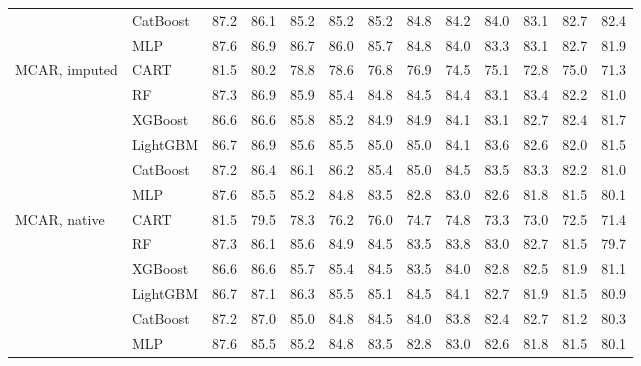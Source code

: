 \documentclass[pdflatex,sn-mathphys]{sn-jnl}
\theoremstyle{thmstyleone}
\begin{document}
\begin{table}[htbp]
\begin{tabular}{@{}llrrrrrrrrrrr@{}}
 & CatBoost & 87.2 & 86.1 & 85.2 & 85.2 & 85.2 & 84.8 & 84.2 & 84.0 & 83.1 & 82.7 & 82.4 \\
 & MLP & 87.6 & 86.9 & 86.7 & 86.0 & 85.7 & 84.8 & 84.0 & 83.3 & 83.1 & 82.7 & 81.9 \\
\midrule
MCAR, imputed & CART & 81.5 & 80.2 & 78.8 & 78.6 & 76.8 & 76.9 & 74.5 & 75.1 & 72.8 & 75.0 & 71.3 \\
 & RF & 87.3 & 86.9 & 85.9 & 85.4 & 84.8 & 84.5 & 84.4 & 83.1 & 83.4 & 82.2 & 81.0 \\
 & XGBoost & 86.6 & 86.6 & 85.8 & 85.2 & 84.9 & 84.9 & 84.1 & 83.1 & 82.7 & 82.4 & 81.7 \\
 & LightGBM & 86.7 & 86.9 & 85.6 & 85.5 & 85.0 & 85.0 & 84.1 & 83.6 & 82.6 & 82.0 & 81.5 \\
 & CatBoost & 87.2 & 86.4 & 86.1 & 86.2 & 85.4 & 85.0 & 84.5 & 83.5 & 83.3 & 82.2 & 81.0 \\
 & MLP & 87.6 & 85.5 & 85.2 & 84.8 & 83.5 & 82.8 & 83.0 & 82.6 & 81.8 & 81.5 & 80.1 \\
\midrule
MCAR, native & CART & 81.5 & 79.5 & 78.3 & 76.2 & 76.0 & 74.7 & 74.8 & 73.3 & 73.0 & 72.5 & 71.4 \\
 & RF & 87.3 & 86.1 & 85.6 & 84.9 & 84.5 & 83.5 & 83.8 & 83.0 & 82.7 & 81.5 & 79.7 \\
 & XGBoost & 86.6 & 86.6 & 85.7 & 85.4 & 84.5 & 83.5 & 84.0 & 82.8 & 82.5 & 81.9 & 81.1 \\
 & LightGBM & 86.7 & 87.1 & 86.3 & 85.5 & 85.1 & 84.5 & 84.1 & 82.7 & 81.9 & 81.5 & 80.9 \\
 & CatBoost & 87.2 & 87.0 & 85.0 & 84.8 & 84.5 & 84.0 & 83.8 & 82.4 & 82.7 & 81.2 & 80.3 \\
 & MLP & 87.6 & 85.5 & 85.2 & 84.8 & 83.5 & 82.8 & 83.0 & 82.6 & 81.8 & 81.5 & 80.1 \\
\bottomrule
\end{tabular}
\end{table}
\end{document}
